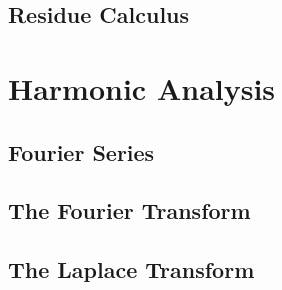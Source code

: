 \documentclass[10pt]{scrartcl}
\numberwithin{equation}{subsection}
\theoremstyle{definition}
\theoremstyle{remark}
\begin{document}
\subsection{Residue Calculus}
\section{Harmonic Analysis}
\label{HarmonicAnalysis}
\subsection{Fourier Series}
\subsection{The Fourier Transform}
\subsection{The Laplace Transform}
\end{document}
